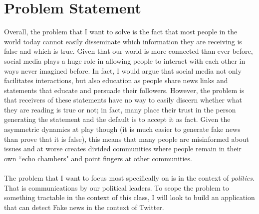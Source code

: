 \documentclass[12pt, final]{article}
\begin{document}
\section{Problem Statement}
Overall, the problem that I want to solve is the fact that most people in the world today cannot easily disseminate which information they are receiving is false and which is true. Given that our world is more connected than ever before, social media plays a huge role in allowing people to interact with each other in ways never imagined before. In fact, I would argue that social media not only facilitates interactions, but also education as people share news links and statements that educate and persuade their followers. However, the problem is that receivers of these statements have no way to easily discern whether what they are reading is true or not; in fact, many place their trust in the person generating the statement and the default is to accept it as fact. Given the asymmetric dynamics at play though (it is much easier to generate fake news than prove that it is false), this means that many people are misinformed about issues and at worse creates divided communities where people remain in their own ``echo chambers" and point fingers at other communities.
\\
\\
The problem that I want to focus most specifically on is in the context of \textit{politics}. That is communications by our political leaders. To scope the problem to something tractable in the context of this class, I will look to build an application that can detect Fake news in the context of Twitter.
\end{document}
